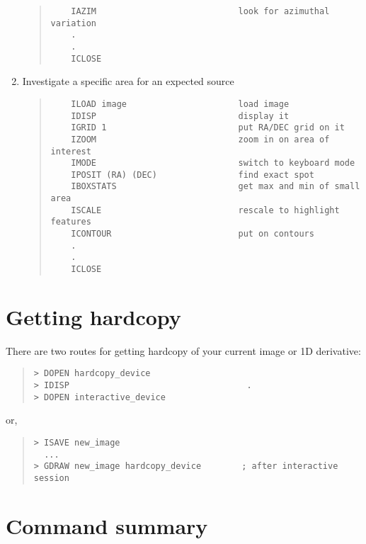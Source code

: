 \documentclass{book}
\renewcommand{\_}{{\tt\char'137}}     %
\begin{document}
\begin{enumerate}
\begin{quote}
\begin{verbatim}
    IAZIM                            look for azimuthal variation
    .
    .
    ICLOSE
\end{verbatim}\end{quote}
\item Investigate a specific area for an expected source
\begin{quote}\begin{verbatim}
    ILOAD image                      load image
    IDISP                            display it
    IGRID 1                          put RA/DEC grid on it
    IZOOM                            zoom in on area of interest
    IMODE                            switch to keyboard mode
    IPOSIT (RA) (DEC)                find exact spot
    IBOXSTATS                        get max and min of small area
    ISCALE                           rescale to highlight features
    ICONTOUR                         put on contours
    .
    .
    ICLOSE
\end{verbatim}\end{quote}
\end{enumerate}
\section{Getting hardcopy}
There are two routes for getting hardcopy of your current image
or 1D derivative:

\begin{quote}\begin{verbatim}
> DOPEN hardcopy_device
> IDISP                                   .
> DOPEN interactive_device
\end{verbatim}\end{quote}
or,
\begin{quote}\begin{verbatim}
> ISAVE new_image
  ...
> GDRAW new_image hardcopy_device        ; after interactive session
\end{verbatim}\end{quote}
\section{Command summary}
\end{document}
